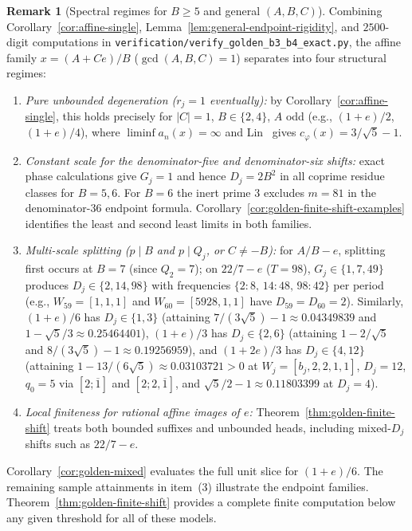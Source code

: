 \documentclass[11pt]{amsart}
\theoremstyle{definition}
\newtheorem{remark}[theorem]{Remark}
\theoremstyle{remark}
\numberwithin{equation}{section}
\begin{document}
\begin{remark}[Spectral regimes for $B\ge5$ and general $(A,B,C)$]\label{rem:golden-general-regimes}
Combining Corollary~\ref{cor:affine-single},
Lemma~\ref{lem:general-endpoint-rigidity}, and $2500$-digit computations in
\texttt{verification/\allowbreak{}verify\_\allowbreak{}golden\_\allowbreak{}b3\_\allowbreak{}b4\_\allowbreak{}exact.py},
the affine family $x=(A+Ce)/B$ ($\gcd(A,B,C)=1$) separates into four
structural regimes:
\begin{enumerate}
\item \emph{Pure unbounded degeneration ($r_j=1$ eventually):} by
      Corollary~\ref{cor:affine-single}, this holds precisely for $|C|=1$,
      $B\in\{2,4\}$, $A$ odd (e.g., $(1+e)/2$, $(1+e)/4$), where
      $\liminf a_n(x)=\infty$ and Lin~\cite[Lemma~4.2]{Lin2018} gives
      $c_\varphi(x)=3/\sqrt5-1$.
\item \emph{Constant scale for the denominator-five and denominator-six shifts:}
      exact phase calculations give $G_j=1$ and hence $D_j=2B^2$ in all
      coprime residue classes for $B=5,6$. For $B=6$ the inert prime $3$
      excludes $m=81$ in the denominator-$36$ endpoint formula.
      Corollary~\ref{cor:golden-finite-shift-examples} identifies the
      least and second least limits in both families.
\item \emph{Multi-scale splitting ($p\mid B$ and $p\mid Q_j$, or $C\ne-B$):}
      for $A/B-e$, splitting first occurs at $B=7$ (since $Q_2=7$); on
      $22/7-e$ ($T=98$), $G_j\in\{1,7,49\}$ produces $D_j\in\{2,14,98\}$
      with frequencies $\{2:8,\,14:48,\,98:42\}$ per period (e.g.,
      $W_{59}=[1,1,1]$ and $W_{60}=[5928,1,1]$ have $D_{59}=D_{60}=2$).
      Similarly, $(1+e)/6$ has $D_j\in\{1,3\}$ (attaining
      $7/(3\sqrt5)-1\approx0.04349839$ and $1-\sqrt5/3\approx0.25464401$),
      $(1+e)/3$ has $D_j\in\{2,6\}$ (attaining $1-2/\sqrt5$ and
      $8/(3\sqrt5)-1\approx0.19256959$), and $(1+2e)/3$ has $D_j\in\{4,12\}$
      (attaining $1-13/(6\sqrt5)\approx0.03103721>0$ at $W_j=[b_j,2,2,1,1]$,
      $D_j=12$, $q_0=5$ via $[2;\overline1]$ and $[2;2,\overline1]$, and
      $\sqrt5/2-1\approx0.11803399$ at $D_j=4$).
\item \emph{Local finiteness for rational affine images of $e$:}
      Theorem~\ref{thm:golden-finite-shift} treats both bounded suffixes
      and unbounded heads, including mixed-$D_j$ shifts such as $22/7-e$.
\end{enumerate}
Corollary~\ref{cor:golden-mixed} evaluates the full unit slice for
$(1+e)/6$. The remaining sample attainments in item~(3) illustrate
the endpoint families. Theorem~\ref{thm:golden-finite-shift} provides
a complete finite computation below any given threshold for all
of these models.
\end{remark}
\end{document}
